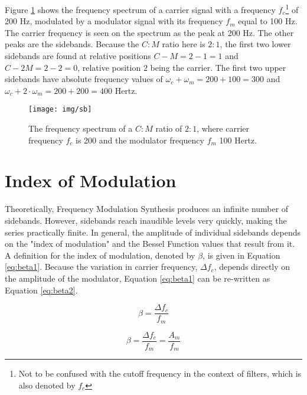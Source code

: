   \noindent Figure \ref{fig:sb} shows the frequency spectrum of a carrier signal with a frequency $f_{c}$\footnote{Not to be confused with the cutoff frequency in the context of filters, which is also denoted by $f_{c}$} of 200 Hz, modulated by a modulator signal with its frequency $f_{m}$ equal to 100 Hz. The carrier frequency is seen on the spectrum as the peak at 200 Hz. The other peaks are the sidebands. Because the $C:M$ ratio here is $2:1$, the first two lower sidebands are found at relative positions $C-M=2-1=1$ and $C-2M=2-2=0$, relative position $2$ being the carrier. The first two upper sidebands have absolute frequency values of $\omega_{c} + \omega_{m} = 200 + 100 = 300$ and %
  $\omega_{c} +2\cdot\omega_{m} = 200 + 200 = 400$ Hertz.\\

  \begin{figure}[]
    \texttt{[image: img/sb]}
    \caption{The frequency spectrum of a $C:M$ ratio of $2:1$, where carrier frequency $f_{c}$ is 200 and the modulator frequency $f_{m}$ 100 Hertz.}
    \label{fig:sb}
  \end{figure}

  \pagebreak

  \section{Index of Modulation}

  Theoretically, Frequency Modulation Synthesis produces an infinite number of sidebands. However, sidebands reach inaudible levels very quickly, making the series practically finite. In general, the amplitude of individual sidebands depends on the "index of modulation" and the Bessel Function values that result from it. A definition for the index of modulation, denoted by $\beta$, is given in Equation \ref{eq:beta1}. Because the variation in carrier frequency, $\Delta f_{c}$, depends directly on the amplitude of the modulator, Equation \ref{eq:beta1} can be re-written as Equation \ref{eq:beta2}.

  \begin{multicols}{2}

    \begin{equation}
      \beta = \frac{\Delta f_{c}}{f_{m}}
      \label{eq:beta1}
    \end{equation}

    \begin{equation}
      \beta = \frac{\Delta f_{c}}{f_{m}} = \frac{A_{m}}{f_{m}}
      \label{eq:beta2}
    \end{equation}

  \end{multicols}

